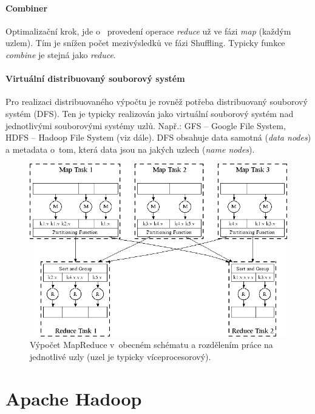 \paragraph*{Combiner} Optimalizační krok, jde o~ provedení operace \textit{reduce} už ve fázi \textit{map} (každým uzlem). Tím je snížen počet mezivýsledků ve fázi Shuffling. Typicky funkce \textit{combine} je stejná jako \textit{reduce}.

\paragraph*{Virtuální distribuovaný souborový systém} Pro realizaci distribuovaného výpočtu je rovněž potřeba distribuovaný souborový systém (DFS). Ten je typicky realizován jako virtuální souborový systém nad jednotlivými souborovými systémy uzlů. Např.: GFS -- Google File System, HDFS -- Hadoop File System (viz dále). DFS obsahuje data samotná (\textit{data nodes}) a metadata o~tom, která data jsou na jakých uzlech (\textit{name nodes}).

\begin{figure}[H]
    \centering
    \includegraphics[width=1\linewidth]{map_reduce_general_p2.png}
    \caption{Výpočet MapReduce v~obecném schématu a rozdělením práce na jednotlivé uzly (uzel je typicky víceprocesorový).}
\end{figure}


\section{Apache Hadoop}

